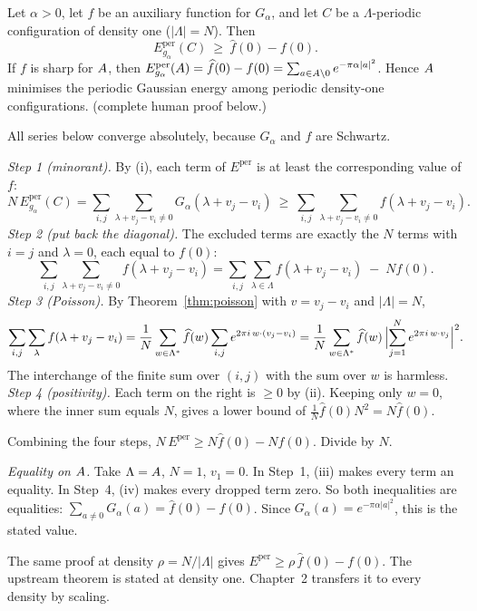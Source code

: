 \begin{theorem}\label{thm:lp-periodic}
Let $\alpha>0$, let $f$ be an auxiliary function for $G_\alpha$, and let $C$ be a $\Lambda$-periodic configuration of
density one ($|\Lambda|=N$). Then
\[
  E^{\mathrm{per}}_{g_\alpha}(C)\ \ge\ \widehat f(0)-f(0).
\]
If $f$ is sharp for $A$, then $E^{\mathrm{per}}_{g_\alpha}(A)=\widehat f(0)-f(0)=\sum_{a\in A\setminus0}e^{-\pi\alpha|a|^2}$.
Hence $A$ minimises the periodic Gaussian energy among periodic density-one configurations. \tierC{} (complete
human proof below.)
\end{theorem}
\begin{humanproof}
All series below converge absolutely, because $G_\alpha$ and $f$ are Schwartz.

\emph{Step 1 (minorant).} By (i), each term of $E^{\mathrm{per}}$ is at least the corresponding value of $f$:
\[
  N\,E^{\mathrm{per}}_{g_\alpha}(C)=\sum_{i,j}\sum_{\lambda+v_j-v_i\ne0}G_\alpha(\lambda+v_j-v_i)
  \ \ge\ \sum_{i,j}\sum_{\lambda+v_j-v_i\ne0}f(\lambda+v_j-v_i).
\]
\emph{Step 2 (put back the diagonal).} The excluded terms are exactly the $N$ terms with $i=j$ and $\lambda=0$, each
equal to $f(0)$:
\[
  \sum_{i,j}\sum_{\lambda+v_j-v_i\ne0}f(\lambda+v_j-v_i)=\sum_{i,j}\sum_{\lambda\in\Lambda}f(\lambda+v_j-v_i)\;-\;N f(0).
\]
\emph{Step 3 (Poisson).} By Theorem~\ref{thm:poisson} with $v=v_j-v_i$ and $|\Lambda|=N$,
\[
  \sum_{i,j}\sum_{\lambda}f(\lambda+v_j-v_i)=\frac1N\sum_{w\in\Lambda^*}\widehat f(w)\sum_{i,j}e^{2\pi i\,w\cdot(v_j-v_i)}
  =\frac1N\sum_{w\in\Lambda^*}\widehat f(w)\,\Bigl|\sum_{j=1}^Ne^{2\pi i\,w\cdot v_j}\Bigr|^2 .
\]
The interchange of the finite sum over $(i,j)$ with the sum over $w$ is harmless.\\
\emph{Step 4 (positivity).} Each term on the right is $\ge0$ by (ii). Keeping only $w=0$, where the inner sum equals
$N$, gives a lower bound of $\frac1N\widehat f(0)N^2=N\widehat f(0)$.

Combining the four steps, $N\,E^{\mathrm{per}}\ge N\widehat f(0)-Nf(0)$. Divide by $N$.

\emph{Equality on $A$.} Take $\Lambda=A$, $N=1$, $v_1=0$. In Step~1, (iii) makes every term an equality. In
Step~4, (iv) makes every dropped term zero. So both inequalities are equalities:
$\sum_{a\ne0}G_\alpha(a)=\widehat f(0)-f(0)$. Since $G_\alpha(a)=e^{-\pi\alpha|a|^2}$, this is the stated value.
\end{humanproof}

\begin{remark}
The same proof at density $\rho=N/|\Lambda|$ gives $E^{\mathrm{per}}\ge\rho\,\widehat f(0)-f(0)$. The upstream theorem
is stated at density one. Chapter~2 transfers it to every density by scaling. \tierC{}
\end{remark}

